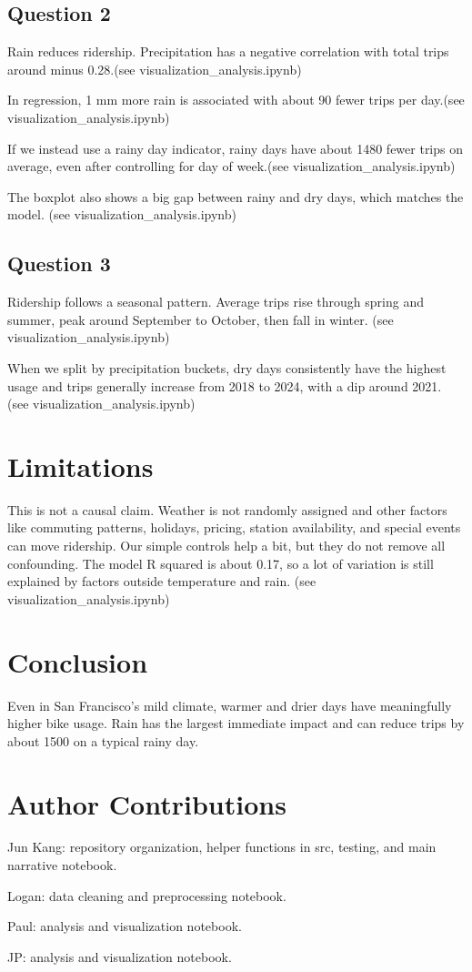 \documentclass{article}
\begin{document}
\subsection{Question 2}

Rain reduces ridership. Precipitation has a negative correlation with total trips around minus 0.28.(see visualization\_analysis.ipynb)

In regression, 1 mm more rain is associated with about 90 fewer trips per day.(see visualization\_analysis.ipynb)

If we instead use a rainy day indicator, rainy days have about 1480 fewer trips on average, even after controlling for day of week.(see visualization\_analysis.ipynb)

The boxplot also shows a big gap between rainy and dry days, which matches the model. (see visualization\_analysis.ipynb)

\subsection{Question 3}

Ridership follows a seasonal pattern. Average trips rise through spring and summer, peak around September to October, then fall in winter. (see visualization\_analysis.ipynb)

When we split by precipitation buckets, dry days consistently have the highest usage and trips generally increase from 2018 to 2024, with a dip around 2021. (see visualization\_analysis.ipynb)

\section{Limitations}

This is not a causal claim. Weather is not randomly assigned and other factors like commuting patterns, holidays, pricing, station availability, and special events can move ridership. Our simple controls help a bit, but they do not remove all confounding. The model R squared is about 0.17, so a lot of variation is still explained by factors outside temperature and rain. (see visualization\_analysis.ipynb)

\section{Conclusion}

Even in San Francisco's mild climate, warmer and drier days have meaningfully higher bike usage. Rain has the largest immediate impact and can reduce trips by about 1500 on a typical rainy day.

\section{Author Contributions}

Jun Kang: repository organization, helper functions in src, testing, and main narrative notebook.

Logan: data cleaning and preprocessing notebook.

Paul: analysis and visualization notebook.

JP: analysis and visualization notebook.
\end{document}
